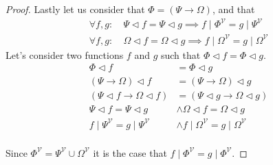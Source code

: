 \documentclass{article}
\begin{document}
\begin{proof}
Lastly let us consider that $\Phi = (\Psi\rightarrow\Omega)$, and that
\begin{align*}
\forall f,g: & \: \Psi   \lhd f = \Psi   \lhd g \implies f\mid\Phi^\mathcal{V}  =g\mid\Psi^\mathcal{V}   \\
\forall f,g: & \: \Omega \lhd f = \Omega \lhd g \implies f\mid\Omega^\mathcal{V}=g\mid\Omega^\mathcal{V}
\end{align*}
Let's consider two functions $f$ and $g$ such that $\Phi\lhd f=\Phi\lhd g$.
\begin{align*}
\Phi\lhd f                          &= \Phi\lhd g                              \\
(\Psi\rightarrow\Omega)\lhd f       &= (\Psi\rightarrow\Omega)\lhd g           \\
(\Psi\lhd f\rightarrow\Omega\lhd f) &= (\Psi\lhd g\rightarrow\Omega\lhd g)     \\
\Psi\lhd f = \Psi\lhd g             &\land \Omega\lhd f = \Omega\lhd g         \\
f\mid\Psi^\mathcal{V} = g\mid\Psi^\mathcal{V}     &\land f\mid\Omega^\mathcal{V} = g\mid\Omega^\mathcal{V} \\
\end{align*}

Since $\Phi^\mathcal{V} = \Psi^\mathcal{V}\cup\Omega^\mathcal{V}$ it is the case that $f\mid\Phi^\mathcal{V} = g\mid\Phi^\mathcal{V}$.

\end{proof}
\end{document}
